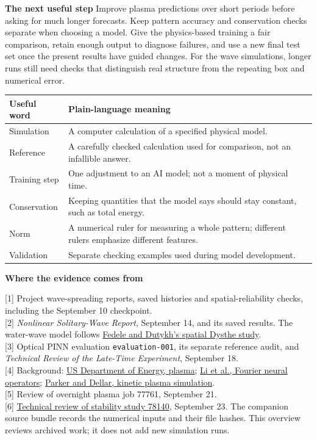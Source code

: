 \documentclass[11pt]{article}
\newcommand{\topic}[1]{\par\smallskip\noindent\textbf{#1}\quad}
\begin{document}
\topic{The next useful step}
Improve plasma predictions over short periods before asking for
much longer forecasts. Keep pattern accuracy and conservation checks separate
when choosing a model. Give the physics-based training a fair comparison,
retain enough output to diagnose failures, and use a new final test set
once the present results have guided changes. For the wave simulations,
longer runs still need checks that distinguish real structure from the
repeating box and numerical error.

\begin{center}
\small
\begin{tabular}{@{}p{3cm}p{12.1cm}@{}}
\toprule
Useful word & Plain-language meaning \\
\midrule
Simulation & A computer calculation of a specified physical model. \\
Reference & A carefully checked calculation used for comparison, not an infallible answer. \\
Training step & One adjustment to an AI model; not a moment of physical time. \\
Conservation & Keeping quantities that the model says should stay constant, such as total energy. \\
Norm & A numerical ruler for measuring a whole pattern; different rulers emphasize different features. \\
Validation & Separate checking examples used during model development. \\
\bottomrule
\end{tabular}
\end{center}

\smallskip
\noindent\textbf{Where the evidence comes from}\par
{\small\raggedright
[1] Project wave-spreading reports, saved histories and spatial-reliability checks,
including the September 10 checkpoint.\\[3pt]
[2] \emph{Nonlinear Solitary-Wave Report}, September 14, and its saved results.
The water-wave model follows \href{https://arxiv.org/abs/1110.4083}{Fedele and Dutykh's spatial Dysthe study}.\\[3pt]
[3] Optical PINN evaluation \texttt{evaluation-001}, its separate reference audit,
and \emph{Technical Review of the Late-Time Experiment}, September 18.\\[3pt]
[4] Background: \href{https://www.energy.gov/science/doe-explainsplasma}{US Department of Energy, plasma};
\href{https://arxiv.org/abs/2010.08895}{Li et al., Fourier neural operators};
\href{https://arxiv.org/abs/1407.1932}{Parker and Dellar, kinetic plasma simulation}.\\[3pt]
[5] Review of overnight plasma job 77761, September 21.\\[3pt]
[6] \href{https://github.com/matasvai/dysthe-pinn/blob/b9630e6/reports/plasma-stability-78140-review/report.tex}{Technical review of stability study 78140}, September 23.
The companion source bundle records the numerical inputs and their file hashes.
This overview reviews archived work; it does not add new simulation runs.\par}
\end{document}
